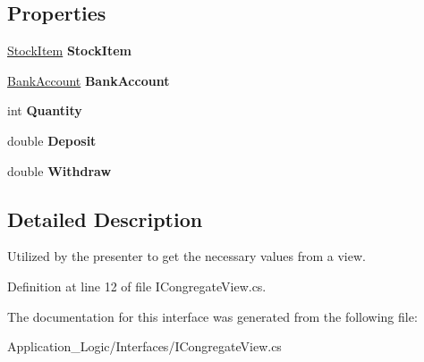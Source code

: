 \subsection*{Properties}
\begin{DoxyCompactItemize}
\item 
\hypertarget{interface_application_logic_1_1_interfaces_1_1_i_congregate_view_a379cad9f36dde76eb839da33b13b46c4}{
\hyperlink{class_application_logic_1_1_model_1_1_stock_item}{StockItem} {\bfseries StockItem}}
\label{interface_application_logic_1_1_interfaces_1_1_i_congregate_view_a379cad9f36dde76eb839da33b13b46c4}

\item 
\hypertarget{interface_application_logic_1_1_interfaces_1_1_i_congregate_view_ac8d3b86eecd6f41fbe0a0ba369de9625}{
\hyperlink{class_application_logic_1_1_model_1_1_bank_account}{BankAccount} {\bfseries BankAccount}}
\label{interface_application_logic_1_1_interfaces_1_1_i_congregate_view_ac8d3b86eecd6f41fbe0a0ba369de9625}

\item 
\hypertarget{interface_application_logic_1_1_interfaces_1_1_i_congregate_view_a8920fd9e96fd1e8baeec8497367df859}{
int {\bfseries Quantity}}
\label{interface_application_logic_1_1_interfaces_1_1_i_congregate_view_a8920fd9e96fd1e8baeec8497367df859}

\item 
\hypertarget{interface_application_logic_1_1_interfaces_1_1_i_congregate_view_afc398dfc5c3dc0d798b5426c47368961}{
double {\bfseries Deposit}}
\label{interface_application_logic_1_1_interfaces_1_1_i_congregate_view_afc398dfc5c3dc0d798b5426c47368961}

\item 
\hypertarget{interface_application_logic_1_1_interfaces_1_1_i_congregate_view_a469e39f34d68c65cb09c0e39a67a03d5}{
double {\bfseries Withdraw}}
\label{interface_application_logic_1_1_interfaces_1_1_i_congregate_view_a469e39f34d68c65cb09c0e39a67a03d5}

\end{DoxyCompactItemize}


\subsection{Detailed Description}
Utilized by the presenter to get the necessary values from a view. 

Definition at line 12 of file ICongregateView.cs.



The documentation for this interface was generated from the following file:\begin{DoxyCompactItemize}
\item 
Application\_\-Logic/Interfaces/ICongregateView.cs\end{DoxyCompactItemize}
